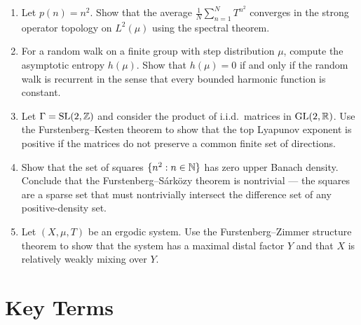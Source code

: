 \begin{enumerate}
    \item [I] Let \(p(n) = n^2\). Show that the average \(\frac{1}{N}\sum_{n=1}^N T^{n^2}\) converges in the strong operator topology on \(L^2(\mu)\) using the spectral theorem.
    \item [I] For a random walk on a finite group with step distribution \(\mu\), compute the asymptotic entropy \(h(\mu)\). Show that \(h(\mu) = 0\) if and only if the random walk is recurrent in the sense that every bounded harmonic function is constant.
    \item [I] Let \(\Gamma = \operatorname{SL}(2,\mathbb{Z})\) and consider the product of i.i.d.\ matrices in \(\operatorname{GL}(2,\mathbb{R})\). Use the Furstenberg--Kesten theorem to show that the top Lyapunov exponent is positive if the matrices do not preserve a common finite set of directions.
    \item [B] Show that the set of squares \(\{n^2 : n \in \mathbb{N}\}\) has zero upper Banach density. Conclude that the Furstenberg--S\'ark\"ozy theorem is nontrivial --- the squares are a sparse set that must nontrivially intersect the difference set of any positive-density set.
    \item [I] Let \((X,\mu,T)\) be an ergodic system. Use the Furstenberg--Zimmer structure theorem to show that the system has a maximal distal factor \(Y\) and that \(X\) is relatively weakly mixing over \(Y\).
\end{enumerate}

\section{Key Terms}

